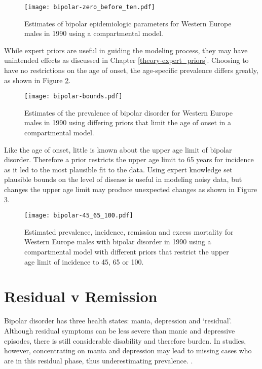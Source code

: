     \begin{figure}[h]
        \begin{center}
            \texttt{[image: bipolar-zero\_before\_ten.pdf]}
            \caption{Estimates of bipolar epidemiologic parameters for Western Europe males in 1990 using a compartmental model.}
            \label{fig:app-bipolar fit}
        \end{center}
    \end{figure}

While expert priors are useful in guiding the modeling process, they may have unintended effects as discussed in Chapter \ref{theory-expert_priors}.  Choosing to have no restrictions on the age of onset, the age-specific prevalence differs greatly, as shown in Figure \ref{fig:app-bipolar bounds}.

    \begin{figure}[h]
        \begin{center}
            \texttt{[image: bipolar-bounds.pdf]}
            \caption{Estimates of the prevalence of bipolar disorder for Western Europe males in 1990 using differing priors that limit the age of onset in a compartmental model.}
            \label{fig:app-bipolar bounds}
        \end{center}
    \end{figure}

Like the age of onset, little is known about the upper age limit of bipolar disorder.  Therefore a prior restricts the upper age limit to 65 years for incidence as it led to the most plausible fit to the data.  Using expert knowledge set plausible bounds on the level of disease is useful in modeling noisy data, but changes the upper age limit may produce unexpected changes as shown in Figure \ref{fig:app-bipolar onset}.

    \begin{figure}[h]
        \begin{center}
            \texttt{[image: bipolar-45\_65\_100.pdf]}
            \caption{Estimated prevalence, incidence, remission and excess mortality for Western Europe males with bipolar disorder in 1990 using a compartmental model with different priors that restrict the upper age limit of incidence to 45, 65 or 100.}
            \label{fig:app-bipolar onset}
        \end{center}
    \end{figure}

\section{Residual v Remission}
Bipolar disorder has three health states: mania, depression and `residual'.  Although residual symptoms can be less severe than manic and depressive episodes, there is still considerable disability and therefore burden.  In studies, however, concentrating on mania and depression may lead to missing cases who are in this residual phase, thus underestimating prevalence. \cite{angst_historical_2000}.

